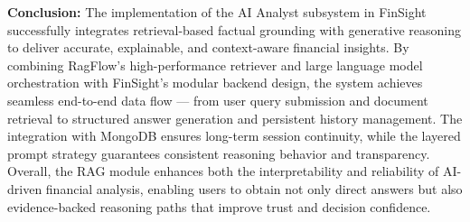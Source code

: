 \textbf{Conclusion: } The implementation of the AI Analyst subsystem in FinSight successfully integrates retrieval-based factual grounding with generative reasoning to deliver accurate, explainable, and context-aware financial insights. By combining RagFlow’s high-performance retriever and large language model orchestration with FinSight’s modular backend design, the system achieves seamless end-to-end data flow --- from user query submission and document retrieval to structured answer generation and persistent history management. The integration with MongoDB ensures long-term session continuity, while the layered prompt strategy guarantees consistent reasoning behavior and transparency. Overall, the RAG module enhances both the interpretability and reliability of AI-driven financial analysis, enabling users to obtain not only direct answers but also evidence-backed reasoning paths that improve trust and decision confidence.





